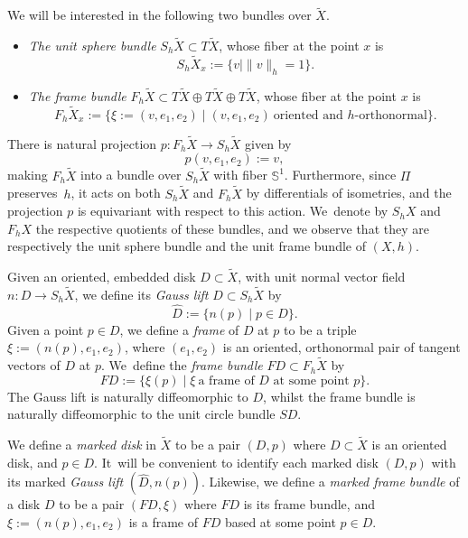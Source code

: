 \documentclass[JEP,XML,SOM,Unicode,NoEqCountersInSection,published]{cedram}
\theoremstyle{plain}
\theoremstyle{definition}
\let\dans\subset
\begin{document}
We will be interested in the following two bundles over $\tilde{X}$.
\begin{itemize}
\item \emph{The unit sphere bundle} $S_h\tilde{X}\dans T\tilde{X}$, whose fiber at the point $x$ is
\begin{equation*}
S_h\tilde{X}_x:=\{v\mid \|v\|_h=1\}.
\end{equation*}
\item \emph{The frame bundle} $F_h\tilde{X}\dans T\tilde{X}\oplus T\tilde{X}\oplus T\tilde{X}$, whose fiber at the point $x$ is
\begin{equation*}
F_h\tilde{X}_x:=\{\xi:=(v,e_1,e_2)\mid (v,e_1,e_2)\ \text{oriented and $h$-orthonormal}\}.
\end{equation*}
\end{itemize}
There is natural projection $p:F_h\tilde{X}\to S_h\tilde{X}$ given by
\begin{equation*}
p(v,e_1,e_2):=v,
\end{equation*}
making $F_h\tilde{X}$ into a bundle over $S_h\tilde{X}$ with fiber $\mathbb{S}^1$. Furthermore, since $\Pi$ preserves~$h$, it acts on both $S_h\tilde{X}$ and $F_h\tilde{X}$ by differentials of isometries, and the projection $p$ is equivariant with respect to this action. We~denote by $S_hX$ and $F_hX$ the respective quotients of these bundles, and we observe that they are respectively the unit sphere bundle and the unit frame bundle of $(X,h)$.

Given an oriented, embedded disk $D\dans\tilde{X}$, with unit normal vector field $n:D\to S_h\tilde{X}$, we define its \emph{Gauss lift} $\hat{D}\dans S_h\tilde{X}$ by
\begin{equation*}
\hat{D} := \{n(p)\mid p\in D\}.
\end{equation*}
Given a point $p\in D$, we define a \emph{frame} of $D$ at $p$ to be a triple $\xi:=(n(p),e_1,e_2)$, where $(e_1,e_2)$ is an oriented, orthonormal pair of tangent vectors of $D$ at $p$. We~define the \emph{frame bundle} $FD\dans F_h\tilde{X}$ by
\begin{equation*}
FD := \{\xi(p)\mid \xi\ \text{a frame of $D$ at some point $p$}\}.
\end{equation*}
The Gauss lift is naturally diffeomorphic to $D$, whilst the frame bundle is naturally diffeomorphic to the unit circle bundle $SD$.

We define a \emph{marked disk} in $\tilde{X}$ to be a pair $(D,p)$ where $D\dans\tilde{X}$ is an oriented disk, and $p\in D$. It~will be convenient to identify each marked disk $(D,p)$ with its marked \emph{Gauss lift} $(\hat{D},n(p))$. Likewise, we define a \emph{marked frame bundle} of a disk $D$ to be a pair $(FD,\xi)$ where $FD$ is its frame bundle, and $\xi:=(n(p),e_1,e_2)$ is a frame of $FD$ based at some point $p\in D$.
\end{document}
